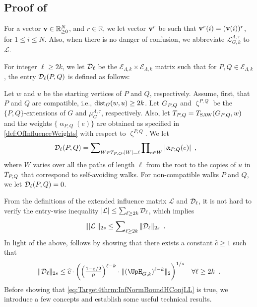 \documentclass[11pt,reqno]{amsart}
\numberwithin{equation}{section}
\newcommand{\cE}{{\mathcal{E}}}
\newcommand{\cL}{{\mathcal{L}}}
\newcommand{\applegreen}[1]{ {\color{applegreen}#1}}
\newcommand{\amethyst}[1]{{\color{amethyst}#1} }
\newcommand{\blue}[1]{{\color{blue}#1}}
\newcommand{\bluepigment}[1]{{\color{blue(pigment)}#1}}
\newcommand{\bostonuniversityred}[1]{{\color{bostonuniversityred}#1}}
\newcommand{\capri}[1]{{\color{capri}#1}}
\newcommand{\cadmiumgreen}[1]{{\color{cadmiumgreen}#1}}
\newcommand{\darkmagenta}[1]{{\color{darkmagenta}#1}}
\newcommand{\goldenbrown}[1]{{\color{goldenbrown}#1}}
\newcommand{\iris}[1]{{\color{iris}#1}}
\newcommand{\red}[1]{{\color{red}#1}}
\newcommand{\rosegold}[1]{{\color{rosegold}#1}}
\newcommand{\dist}{{\rm dist}}
\newcommand{\ExtV}{\iris{\cE}}
\newcommand{\pfs}{\darkmagenta{s}}
\newcommand{\Tsaw}{T_{\rm SAW}}
\newcommand{\norm}[2]{\goldenbrown{\|} #1 \goldenbrown{\|}_{#2}}
\newcommand{\abs}[1]{\blue{|}#1\blue{|}}
\newcommand{\NBMatrix}{\cadmiumgreen{\UpH}_{G,\kk}}
\renewcommand{\applegreen}[1]{#1}
\renewcommand{\amethyst}[1]{#1}
\renewcommand{\blue}[1]{#1}
\renewcommand{\bluepigment}[1]{#1}
\renewcommand{\bostonuniversityred}[1]{#1}
\renewcommand{\capri}[1]{#1}
\renewcommand{\cadmiumgreen}[1]{#1}
\renewcommand{\darkmagenta}[1]{#1}
\renewcommand{\goldenbrown}[1]{#1}
\renewcommand{\iris}[1]{#1}
\renewcommand{\red}[1]{#1}
\renewcommand{\rosegold}[1]{#1}
\newcommand{\ke}{\blue{e}}
\newcommand{\ki}{\capri{i}}
\newcommand{\kk}{\bluepigment{k}}
\newcommand{\kell}{{\color{green(pigment)}\ell}}%
\newcommand{\kP}{\goldenbrown{P}}
\newcommand{\kQ}{\amethyst{Q}}
\newcommand{\kr}{\bostonuniversityred{r}}%
\newcommand{\ku}{\red{u}}
\newcommand{\kW}{\blue{W}}
\newcommand{\kw}{\blue{w}}
\renewcommand{\ke}{e}
\renewcommand{\ki}{i}
\renewcommand{\kk}{k}
\renewcommand{\kell}{\ell}
\renewcommand{\kP}{P}
\renewcommand{\kQ}{Q}
\renewcommand{\kr}{r}
\renewcommand{\ku}{u}
\renewcommand{\kW}{W}
\renewcommand{\kw}{w}
\newcommand{\ExtdInfMatrix}{\rosegold{\cL}}
\newcommand{\ExtdInfMatrixF}{\applegreen{\cL}^{\Lambda,\tau}_{G,\kk}}
\newcommand{\infweight}{\upalpha}
\newcommand{\SingBound}{\uprho}
\begin{document}
\subsection{Proof of }\label{sec:thrm:InfNormBoundHConj}
% 
For a vector ${\bf v}\in \mathbb{R}^{N}_{\geq 0}$,  and $\kr \in \mathbb{R}$, we let vector ${\bf v}^{\kr}$ be such 
that ${\bf v}^{\kr}(\ki)=({\bf v}(\ki))^{\kr}$, for $1\leq \ki \leq  N$.  Also, when there is no danger of confusion, we abbreviate $\ExtdInfMatrixF$ to $\ExtdInfMatrix$.


For integer $\kell\geq 2\kk$, we let $\ExtdInfMatrixL_{\kell}$ be the $\ExtV_{\Lambda,\kk}\times \ExtV_{\Lambda,\kk}$ matrix 
such that for $\kP,\kQ \in \ExtV_{\Lambda,\kk}$,  the entry $\ExtdInfMatrixL_{\kell}(\kP,\kQ)$ is defined as follows: 


Let $\kw$ and $\ku$ be the starting vertices of $\kP$ and $\kQ$, respectively.
%
Assume, first, that $\kP$ and $\kQ$ are compatible, i.e., $\dist_G(\kw,\ku)\geq 2\kk$.  Let $\gext{G}{\kP,\kQ}$ 
and $\upzeta^{\kP,\kQ}$ be the $\{\kP,\kQ\}$-extensions of $G$ and  $\mu^{\Lambda,\tau}_G$, respectively.  
Also, let $\TPQ=\Tsaw(G_{\kP,\kQ}, \kw)$ and the weights $\{ \infweight_{\kP,\kQ}(\ke)\}$ are obtained as  specified  
in \eqref{def:OfInfluenceWeights} with respect to $\upzeta^{\kP,\kQ}$.  We let
\begin{align}\nonumber
\ExtdInfMatrixL_{\kell}(\kP, \kQ) &=\sum\nolimits_{\kW\in \TPQ: \abs{\kW}=\kell} \prod\nolimits_{\ke\in \kW} \abs{\infweight_{\kP,\kQ}(\ke)} \enspace, 
\end{align}
where $\kW$ varies over all the paths of length $\kell$ from the root to the copies of $\ku$ in $\TPQ$ that correspond to
self-avoiding walks.   For non-compatible walks $\kP$ and $\kQ$, we let  $\ExtdInfMatrixL_{\kell}(\kP, \kQ) =0$. 


From the definitions of the extended influence matrix $\ExtdInfMatrix$ and $ \ExtdInfMatrixL_{\kell}$, it is not hard to 
verify the entry-wise inequality   $\abs{\ExtdInfMatrix} \leq \sum\nolimits_{\kell\geq 2\kk} \ExtdInfMatrixL_{\kell}$, which
%
implies 
\begin{align}\nonumber 
\norm{ \abs{\ExtdInfMatrix}}{2\pfs} &
% 
\leq \sum\nolimits_{\kell\geq 2\kk} \norm{ \ExtdInfMatrixL_{\kell}}{2\pfs}\enspace.
\end{align}
%
In light of the above,  follows by showing that there exists a constant 
$\widehat{c}\geq 1$ such that
%
\begin{align}\label{eq:Target4thrm:InfNormBoundHConjLL}
\norm{ \ExtdInfMatrixL_{\kell}}{2\pfs} &\leq \widehat{c} \cdot \left(
 {\textstyle \left(\frac{1-\varepsilon/2}{\SingBound}\right)^{\kell-\kk}} \cdot 
\norm{ (\NBMatrix)^{{\kell-\kk}}}{2}
 \right)^{1/\pfs} & \forall \kell\geq 2\kk \enspace.
\end{align}
%
Before showing that \eqref{eq:Target4thrm:InfNormBoundHConjLL} is true,
we introduce a few concepts and establish some useful technical results. 
\end{document}
